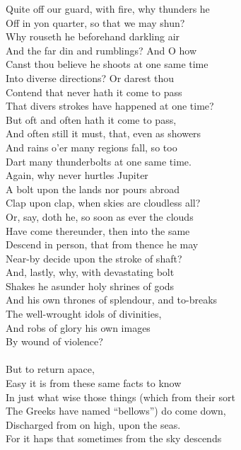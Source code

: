 Quite off our guard, with fire, why thunders he\\
Off in yon quarter, so that we may shun?\\
Why rouseth he beforehand darkling air\\
And the far din and rumblings? And O how\\
Canst thou believe he shoots at one same time\\
Into diverse directions? Or darest thou\\
Contend that never hath it come to pass\\
That divers strokes have happened at one time?\\
But oft and often hath it come to pass,\\
And often still it must, that, even as showers\\
And rains o'er many regions fall, so too\\
Dart many thunderbolts at one same time.\\
Again, why never hurtles Jupiter\\
A bolt upon the lands nor pours abroad\\
Clap upon clap, when skies are cloudless all?\\
Or, say, doth he, so soon as ever the clouds\\
Have come thereunder, then into the same\\
Descend in person, that from thence he may\\
Near-by decide upon the stroke of shaft?\\
And, lastly, why, with devastating bolt\\
Shakes he asunder holy shrines of gods\\
And his own thrones of splendour, and to-breaks\\
The well-wrought idols of divinities,\\
And robs of glory his own images\\
By wound of violence?\\
\\
But to return apace,\\
Easy it is from these same facts to know\\
In just what wise those things (which from their sort\\
The Greeks have named ``bellows'') do come down,\\
Discharged from on high, upon the seas.\\
For it haps that sometimes from the sky descends\\
